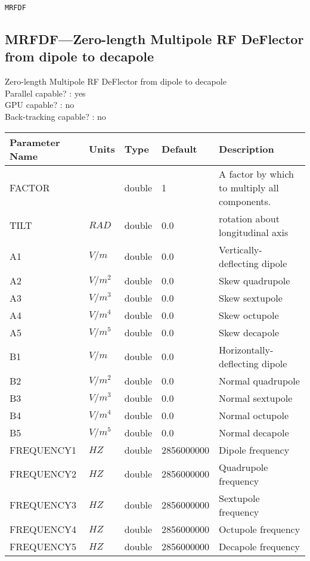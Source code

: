\newpage
\begin{center}{\Large\verb|MRFDF|}\end{center}
\subsection{MRFDF---Zero-length Multipole RF DeFlector from dipole to decapole}
Zero-length Multipole RF DeFlector from dipole to decapole
\\
Parallel capable? : yes\\
GPU capable? : no\\
Back-tracking capable? : no\\
\begin{tabular}{|l|l|l|l|p{\descwidth}|} \hline
Parameter Name & Units & Type & Default & Description \\ \hline 
FACTOR &  & double &   1 & A factor by which to multiply all components.  \\ \hline 
TILT & $RAD$ & double &  0.0 & rotation about longitudinal axis  \\ \hline 
A1 & $V/m$ & double &  0.0 & Vertically-deflecting dipole  \\ \hline 
A2 & $V/m^{2}$ & double &  0.0 & Skew quadrupole  \\ \hline 
A3 & $V/m^{3}$ & double &  0.0 & Skew sextupole  \\ \hline 
A4 & $V/m^{4}$ & double &  0.0 & Skew octupole  \\ \hline 
A5 & $V/m^{5}$ & double &  0.0 & Skew decapole  \\ \hline 
B1 & $V/m$ & double &  0.0 & Horizontally-deflecting dipole  \\ \hline 
B2 & $V/m^{2}$ & double &  0.0 & Normal quadrupole  \\ \hline 
B3 & $V/m^{3}$ & double &  0.0 & Normal sextupole  \\ \hline 
B4 & $V/m^{4}$ & double &  0.0 & Normal octupole  \\ \hline 
B5 & $V/m^{5}$ & double &  0.0 & Normal decapole  \\ \hline 
FREQUENCY1 & $HZ$ & double &   2856000000 & Dipole frequency  \\ \hline 
FREQUENCY2 & $HZ$ & double &   2856000000 & Quadrupole frequency  \\ \hline 
FREQUENCY3 & $HZ$ & double &   2856000000 & Sextupole frequency  \\ \hline 
FREQUENCY4 & $HZ$ & double &   2856000000 & Octupole frequency  \\ \hline 
FREQUENCY5 & $HZ$ & double &   2856000000 & Decapole frequency  \\ \hline 

\end{tabular}
